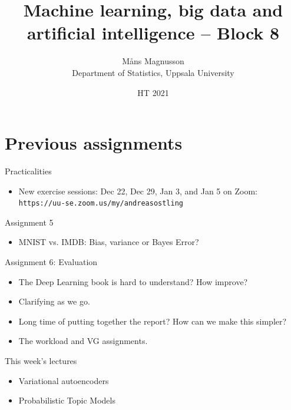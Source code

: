 \documentclass[10pt]{beamer}
\title[]{{\color{black}Machine learning, big data and artificial intelligence -- Block 8}}
\author[]{M{\aa}ns Magnusson\\Department of Statistics, Uppsala University}
\date{HT 2021}
\begin{document}
\frame{\titlepage
}


\section{Previous assignments}

\begin{frame}{Practicalities}

\begin{itemize}
\item New exercise sessions: Dec 22, Dec 29, Jan 3, and Jan 5 on Zoom:
\texttt{https://uu-se.zoom.us/my/andreasostling}
\end{itemize}

\end{frame}

\begin{frame}{Assignment 5}

\begin{itemize}
\item MNIST vs. IMDB: Bias, variance or Bayes Error?
\end{itemize}

\end{frame}

\begin{frame}{Assignment 6: Evaluation}

\begin{itemize}
\item The Deep Learning book is hard to understand? How improve?
\item Clarifying as we go.
\item Long time of putting together the report? How can we make this simpler?
\item The workload and VG assignments.
\end{itemize}

\end{frame}



\begin{frame}{This week's lectures}
\begin{itemize}
\item Variational autoencoders
\item Probabilistic Topic Models
\end{itemize}
\end{frame}


\end{document}
